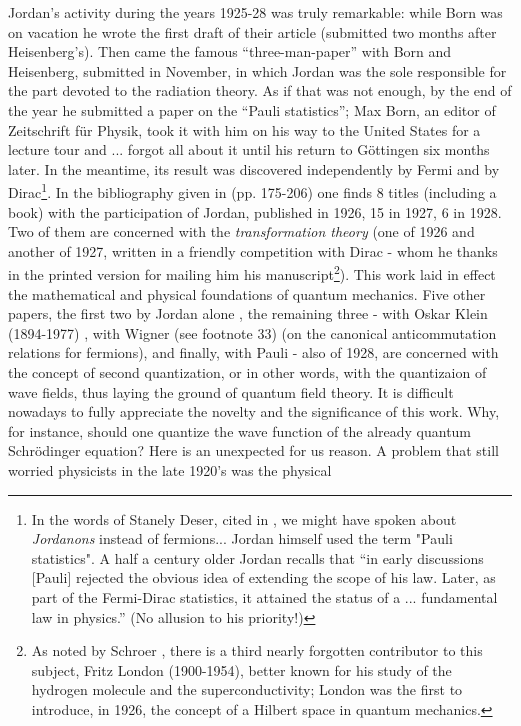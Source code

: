 Jordan's activity during the years 1925-28 was truly remarkable: while Born was on vacation he wrote the first 
draft of their article (submitted two months after Heisenberg's). Then came the famous ``three-man-paper'' with 
Born and Heisenberg, submitted in November, in which Jordan was the sole responsible for the part devoted to the 
radiation theory. As if that was not enough, by the end of the year he submitted a paper on the ``Pauli statistics''; 
Max Born, an editor of Zeitschrift f\"ur Physik, took it with him on his way to the United States for a lecture tour 
and ... forgot all about it until his return to G\"ottingen six months later. In the meantime, its result was discovered 
independently by Fermi and by Dirac\footnote{In the words of Stanely Deser, cited in \cite{S06}, we might have spoken 
about {\it Jordanons} instead of fermions... Jordan himself used the term "Pauli statistics". A half a century older Jordan 
\cite{J} recalls that ``in early discussions [Pauli] rejected the obvious idea of extending the scope of his law. Later,
as part of the Fermi-Dirac statistics, it attained the status of a ... fundamental law in physics.'' (No allusion to 
his priority!)}. In the bibliography given in \cite{PJ07} 
(pp. 175-206) one finds 8 titles (including a book) with the participation of Jordan, published in 1926, 15 in 1927, 6 in 1928. 
Two of them are concerned with the {\it transformation theory} (one of 1926 and another of 1927, written in a friendly 
competition with Dirac - whom he thanks in the printed version for mailing him his manuscript\footnote{As noted by Schroer \cite{S06},
there is a third nearly forgotten contributor to this subject, Fritz London (1900-1954), better known for his study of the hydrogen 
molecule and the superconductivity; London was the first to introduce, in 1926, the concept of a Hilbert space in quantum mechanics.}). 
This work laid in effect the mathematical and physical foundations of quantum mechanics. Five other papers, the first two by Jordan alone 
\cite{J27}, the remaining three - with Oskar Klein (1894-1977) \cite{JK27}, with Wigner (see footnote 33) \cite{JW28} (on the canonical 
anticommutation relations for fermions), and finally, with Pauli - also of 1928, are concerned with the concept of second quantization, 
or in other words, with the quantizaion of wave fields, thus laying the ground of quantum field theory. It is difficult nowadays to fully 
appreciate the novelty and the significance of this work. Why, for instance, should one quantize the wave function of the already quantum
Schr\"odinger equation? Here is an unexpected for us reason. A problem that still worried physicists in the late 1920's was the physical 
